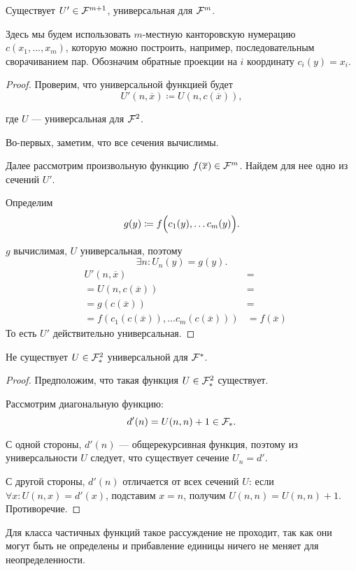 \begin{cor}\label{cor:3}
    Существует $ U' \in  \mathcal{F}^{m+1}$, универсальная для $ \mathcal{F}^{m}$.
\end{cor}
\begin{note}
    Здесь мы будем использовать $ m$-местную канторовскую нумерацию $ c(x_1, \ldots , x_m)$, которую можно построить, например, последовательным сворачиванием пар.
	Обозначим обратные проекции на $ i$ координату $ c_i(y) = x_i$.
\end{note}
\begin{proof}
	Проверим, что универсальной функцией будет
	\[
		U'(n, \overline{x}) \coloneqq U(n, c(\overline{x}))
	,\] 

	где $ U$ --- универсальная для $ \mathcal{F}^{2}$.

	Во-первых, заметим, что все сечения вычислимы. 

	Далее рассмотрим произвольную функцию $ f(\overline{x}) \in \mathcal{F}^{m}$. Найдем для нее одно из сечений $ U'$.

	Определим 
	\[
		g(y)\coloneqq f\Bigl(c_1(y), \ldots c_m(y)\Bigr)
	.\] 

	$ g$ вычислимая, $ U$ универсальная, поэтому 
	\[
		\exists n \colon  U_n(y) = g(y)
	.\] 
	\begin{align*}
		& U'(n, \overline{x}) &=  \tag{по определению  $U$} \\
		&=U(n, c(\overline{x})) &= \tag{$ n$ -- номер $g$} \\
		&=g(c(\overline{x})) &= \tag{по определению $g$} \\
		&= f(c_1(c(\overline{x})), \ldots c_{m}(c(\overline{x})))&= f(\overline{x})
	\end{align*}
	То есть $ U'$ действительно универсальная.
\end{proof}


\begin{thm}
    Не существует $ U \in \mathcal{F}_{*}^{2}$ универсальной для $ \mathcal{F}^{*}$.
\end{thm}
\begin{proof}
    Предположим, что такая функция $ U \in  \mathcal{F}_{*}^{2}$ существует.

	Рассмотрим диагональную функцию:
	\[
		d'(n) = U(n, n) + 1 \in \mathcal{F}_{*}
	.\] 

	С одной стороны, $ d'(n) $  --- общерекурсивная функция, поэтому из универсальности $ U$ следует, что существует сечение $ U_n = d'$.

	С другой стороны, $d'(n)$ отличается от всех сечений $ U$: 
	если $ \forall x \colon U(n, x) = d'(x)$, подставим $ x = n $, получим $U(n, n) = U(n, n ) + 1$. Противоречие. 
\end{proof}
\begin{note}
    Для класса частичных функций такое рассуждение не проходит, так как они могут быть не определены и прибавление единицы ничего не меняет для неопределенности.
\end{note}

